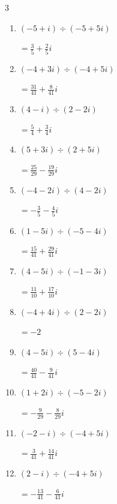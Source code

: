 \begin{multicols}{3}
\begin{enumerate}
  \item $\displaystyle (-5+i)\div(-5+5i)$

        $\displaystyle =\frac{3}{5}+\frac{2}{5}i$

  \item $\displaystyle (-4+3i)\div(-4+5i)$

        $\displaystyle =\frac{31}{41}+\frac{8}{41}i$

  \item $\displaystyle (4-i)\div(2-2i)$

        $\displaystyle =\frac{5}{4}+\frac{3}{4}i$

  \item $\displaystyle (5+3i)\div(2+5i)$

        $\displaystyle =\frac{25}{29}-\frac{19}{29}i$

  \item $\displaystyle (-4-2i)\div(4-2i)$

        $\displaystyle =-\frac{3}{5}-\frac{4}{5}i$

  \item $\displaystyle (1-5i)\div(-5-4i)$

        $\displaystyle =\frac{15}{41}+\frac{29}{41}i$

  \item $\displaystyle (4-5i)\div(-1-3i)$

        $\displaystyle =\frac{11}{10}+\frac{17}{10}i$

\columnbreak %

\resetques

  \item $\displaystyle (-4+4i)\div(2-2i)$

        $\displaystyle =-2$

  \item $\displaystyle (4-5i)\div(5-4i)$

        $\displaystyle =\frac{40}{41}-\frac{9}{41}i$

  \item $\displaystyle (1+2i)\div(-5-2i)$

        $\displaystyle =-\frac{9}{29}-\frac{8}{29}i$

  \item $\displaystyle (-2-i)\div(-4+5i)$

        $\displaystyle =\frac{3}{41}+\frac{14}{41}i$

  \item $\displaystyle (2-i)\div(-4+5i)$

        $\displaystyle =-\frac{13}{41}-\frac{6}{41}i$


\end{enumerate}
\end{multicols}
